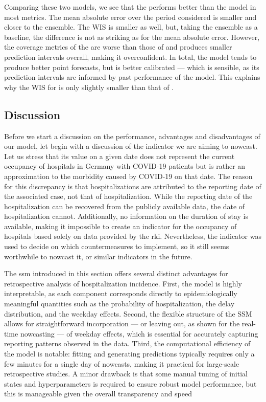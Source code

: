 Comparing these two models, we see that the \ssm performs better than the \ilmprop model in most metrics. The mean absolute error over the period considered is smaller and closer to the ensemble. The WIS is smaller as well, but, taking the ensemble as a baseline, the difference is not as striking as for the mean absolute error. However, the coverage metrics of the \ssm are worse than those of \ilmprop and \ssm produces smaller prediction intervals overall, making it overconfident. In total, the \ssm model tends to produce better point forecasts, but \ilmprop is better calibrated --- which is sensible, as its prediction intervals are informed by past performance of the model. This explains why the WIS for \ssm is only slightly smaller than that of \ilmprop. 

\subsection{Discussion}

Before we start a discussion on the performance, advantages and disadvantages of our model, let begin with a discussion of the indicator we are aiming to nowcast. Let us stress that its value on a given date does not represent the current occupancy of hospitals in Germany with COVID-19 patients but is rather an approximation to the morbidity caused by COVID-19 on that date. The reason for this discrepancy is that hospitalizations are attributed to the reporting date of the associated case, not that of hospitalization. While the reporting date of the hospitalization can be recovered from the publicly available data, the date of hospitalization cannot. Additionally, no information on the duration of stay is available, making it impossible to create an indicator for the occupancy of hospitals based solely on data provided by the \acrshort{rki}.  Nevertheless, the indicator was used to decide on which countermeasures to implement, so it still seems worthwhile to nowcast it, or similar indicators in the future. 

The \acrshort{ssm} introduced in this section offers several distinct advantages for retrospective analysis of hospitalization incidence.  First, the model is highly interpretable, as each component corresponds directly to epidemiologically meaningful quantities such as the probability of hospitalization, the delay distribution, and the weekday effects. 
Second, the flexible structure of the SSM allows for straightforward incorporation --- or leaving out, as shown for the real-time nowcasting --- of weekday effects, which is essential for accurately capturing reporting patterns observed in the data.  Third, the computational efficiency of the model is notable: fitting and generating predictions typically requires only a few minutes for a single day of nowcasts, making it practical for large-scale retrospective studies. 
A minor drawback is that some manual tuning of initial states and hyperparameters is required to ensure robust model performance, but this is manageable given the overall transparency and speed

